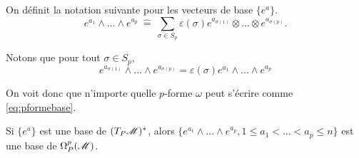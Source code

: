 \documentclass[a4paper,11pt]{report}
\begin{document}
            \begin{definition}
                On définit la notation suivante pour les vecteurs de base $\{e^a\}$.
                \begin{equation}
                    e^{a_1}\wedge \dots\wedge e^{a_{p}} ~\hat{=}~ \sum_{\sigma\in S_p}\varepsilon(\sigma)e^{a_{\sigma(1)}}\otimes\dots\otimes e^{a_{\sigma(p)}}.
                \end{equation}
            \end{definition}
            
            Notons que pour tout $\sigma\in S_p$,
            \begin{equation}
                e^{a_{\sigma(1)}}\wedge\dots\wedge e^{a_{\sigma(p)}} = \varepsilon(\sigma)e^{a_1}\wedge\dots \wedge e^{a_p}
            \end{equation}
            
            On voit donc que n'importe quelle $p$-forme $\omega$ peut s'écrire comme \ref{eq:pformebase}.
            \begin{prop}\begin{leftbar}
                Si $\{e^a\}$ est une base de $(T_P\mathscr{M})^*$, alors $\{e^{a_1}\wedge\dots \wedge e^{a_p},1\leq a_1<\dots<a_p\leq n\}$ est une base de $\Omega_P^p(\mathscr{M})$.
            \end{leftbar}\end{prop}
            
\end{document}
